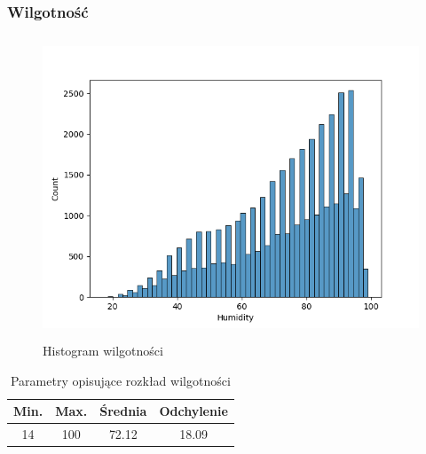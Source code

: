 \documentclass[18pt, letterpaper]{article}
\begin{document}
\subsubsection{Wilgotność}
\begin{figure}[H]
\centering
\includegraphics[width=120mm, height=90mm]{visualisations/histograms/Humidity_hist.png}
\caption{Histogram wilgotności}
\end{figure}
\begin{table}[H]
\centering
\begin{tabular}{|c|c|c|c|}
\hline
Min.  & Max. & Średnia & Odchylenie \\ \hline
14 & 100 & 72.12   & 18.09      \\ \hline
\end{tabular}
\caption{Parametry opisujące rozkład wilgotności}
\end{table}
\end{document}
